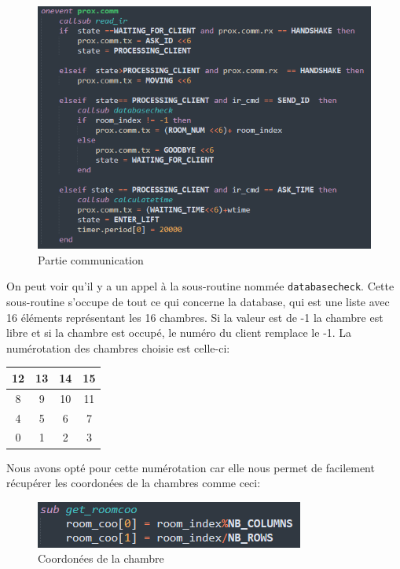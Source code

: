 \begin{figure}[h]
	\centering
	\includegraphics[scale=0.5]{code/server_decodage}
	\caption{Partie communication}
	\label{fig:decodage}
\end{figure}

On peut voir qu'il y a un appel à la sous-routine nommée \texttt{databasecheck}. Cette sous-routine s'occupe de tout ce qui concerne la database, qui est une liste avec 16 éléments représentant les 16 chambres. Si la valeur est de -1 la chambre est libre et si la chambre est occupé, le numéro du client remplace le -1.
La numérotation des chambres choisie est celle-ci:
\begin{center}
	\begin{tabular}{|c|c|c|c|}
		\hline
		12&13  &14  &15  \\
		\hline
		8&9  &10  &11  \\
		\hline
		4&5  &6  &7  \\
		\hline
		0&1  &2  &3  \\
		\hline
	\end{tabular}
\end{center}
Nous avons opté pour cette numérotation car elle nous permet de facilement récupérer les coordonées de la chambres comme ceci:
\begin{figure}[h]
	\centering
	\includegraphics{code/server_roomcoo}
	\caption{Coordonées de la chambre}
	\label{fig:roomcoo}
\end{figure}

